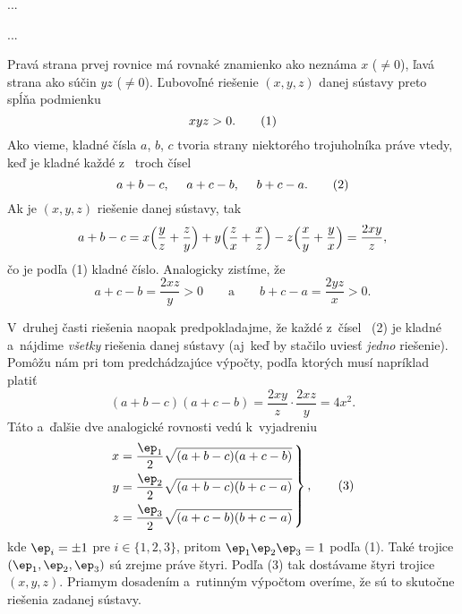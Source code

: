 {%
...}

{%
...}

{%
Pravá strana prvej rovnice má rovnaké znamienko ako
neznáma $x$  ($\ne0$), ľavá strana ako súčin $yz$ ($\ne0$).
Ľubovoľné riešenie $(x,y,z)$ danej sústavy preto spĺňa podmienku
$$
xyz>0.                        \tag 1
$$
Ako vieme, kladné čísla $a$, $b$, $c$ tvoria strany niektorého
trojuholníka práve vtedy, keď je kladné každé z~ troch čísel
$$
a+b-c,\quad\ a+c-b,\quad\ b+c-a.      \tag 2
$$
Ak je $(x,y,z)$ riešenie danej sústavy, tak
$$
a+b-c=x\Bigl(\frac yz+\frac zy\Bigr)+
y\Bigl(\frac zx+\frac xz\Bigr)
-z\Bigl(\frac xy+\frac yx\Bigr)=\frac{2xy}{z},
$$
čo je podľa (1) kladné číslo. Analogicky zistíme, že
$$
a+c-b=\frac{2xz}{y}>0\qquad\text{a}\qquad
b+c-a=\frac{2yz}{x}>0.
$$

V~druhej časti riešenia naopak predpokladajme, že každé z~čísel~ (2)
je kladné a~nájdime {\it všetky\/} riešenia danej sústavy (aj~keď
by stačilo uviesť {\it jedno\/} riešenie). Pomôžu nám pri tom
predchádzajúce výpočty, podľa ktorých musí napríklad platiť
$$
(a+b-c)(a+c-b)=\frac{2xy}{z}\cdot\frac{2xz}{y}=4x^2.
$$
Táto a~ďalšie dve analogické rovnosti vedú k~vyjadreniu
$$
\left.\aligned
x&=\frac{\ep_1}{2}\sqrt{(a+b-c)(a+c-b)}\\
y&=\frac{\ep_2}{2}\sqrt{(a+b-c)(b+c-a)}\\
z&=\frac{\ep_3}{2}\sqrt{(a+c-b)(b+c-a)}
\endaligned\,\right\},                            \tag 3
$$
kde $\ep_i=\pm1$ pre $i\in\{1,2,3\}$, pritom $\ep_1\ep_2\ep_3=1$
podľa (1). Také trojice $(\ep_1,\ep_2,\ep_3)$ sú zrejme
práve štyri. Podľa (3) tak dostávame štyri trojice $(x,y,z)$.
Priamym dosadením a~rutinným výpočtom overíme, že sú to
skutočne riešenia zadanej sústavy.
}

